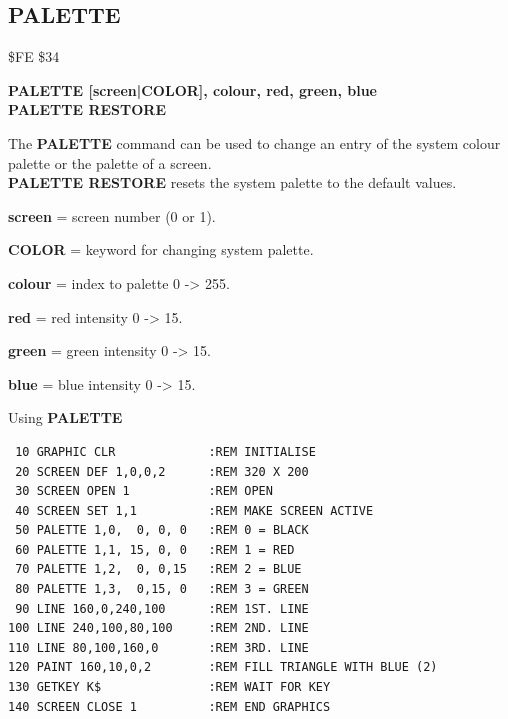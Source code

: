 \subsection{PALETTE}
\begin{description}[leftmargin=2cm,style=nextline]
\item [Token:] \$FE \$34
\item [Format:] {\bf PALETTE [screen|COLOR], colour, red, green, blue} \\
                {\bf PALETTE RESTORE}
\item [Usage:]  The {\bf PALETTE} command can be used to change an
                entry of the system colour palette or the palette
                of a screen. \\
                {\bf PALETTE RESTORE} resets the system palette to
                the default values.

                {\bf screen} = screen number (0 or 1).

                {\bf COLOR} = keyword for changing system palette.

                {\bf colour} = index to palette 0 -> 255.

                {\bf red} = red intensity 0 -> 15.

                {\bf green} = green intensity 0 -> 15.

                {\bf blue} = blue intensity 0 -> 15.

\item [Example:] Using {\bf PALETTE}

\begin{tcolorbox}[colback=black,coltext=white]
\verbatimfont{\codefont}
\begin{verbatim}
 10 GRAPHIC CLR             :REM INITIALISE
 20 SCREEN DEF 1,0,0,2      :REM 320 X 200
 30 SCREEN OPEN 1           :REM OPEN
 40 SCREEN SET 1,1          :REM MAKE SCREEN ACTIVE
 50 PALETTE 1,0,  0, 0, 0   :REM 0 = BLACK
 60 PALETTE 1,1, 15, 0, 0   :REM 1 = RED
 70 PALETTE 1,2,  0, 0,15   :REM 2 = BLUE
 80 PALETTE 1,3,  0,15, 0   :REM 3 = GREEN
 90 LINE 160,0,240,100      :REM 1ST. LINE
100 LINE 240,100,80,100     :REM 2ND. LINE
110 LINE 80,100,160,0       :REM 3RD. LINE
120 PAINT 160,10,0,2        :REM FILL TRIANGLE WITH BLUE (2)
130 GETKEY K$               :REM WAIT FOR KEY
140 SCREEN CLOSE 1          :REM END GRAPHICS
\end{verbatim}
\end{tcolorbox}
\end{description}

